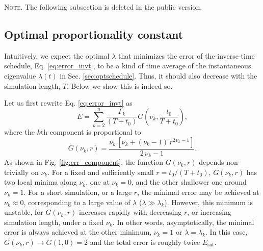 \documentclass[reprint, floatfix]{revtex4-1}
\newcommand{\note}[1]{{\color{DarkGreen}\footnotesize \textsc{Note.} #1}}
\newcommand{\Err}{E}
\begin{document}
%






\note{The following subsection is deleted in the public version.

\subsection{\label{sec:optlambda}
Optimal proportionality constant
}




Intuitively,
we expect the optimal $\lambda$
that minimizes the error of the inverse-time schedule,
Eq. \eqref{eq:error_invt},
to be a kind of time average of
the instantaneous eigenvalue $\lambda(t)$
in Sec. \ref{sec:optschedule}.
%
Thus, it should also decrease with
the simulation length, $T$.
%
Below we show this is indeed so.

Let us first rewrite Eq. \eqref{eq:error_invt} as
%
$$
\Err
=
\sum_{ k = 2 }^n
  \frac{ \Gamma_k  }
       { (T + t_0) }
  G\left( \nu_k, \frac{ t_0 } { T + t_0} \right),
$$
%
where the $k$th component is proportional to
%
$$
G\left( \nu_k, r \right)
=
\frac { \nu_k
        \,
        \left[
          \nu_k
          +
          (\nu_k - 1) \,
          r^{2 \, \nu_k - 1}
        \right]
      }
      { 2 \, \nu_k - 1 }
.
$$
%
As shown in Fig. \ref{fig:err_component},
the function $G(\nu_k, r)$ depends non-trivially on $\nu_k$.
%
For a fixed and sufficiently small $r = t_0 / (T + t_0)$,
$G(\nu_k, r)$ has two local minima along $\nu_k$,
one at $\nu_k = 0$,
and the other shallower one around $\nu_k = 1$.
%
For a short simulation, or a large $r$,
the minimal error may be achieved at $\nu_k \approx 0$,
corresponding to a large value of $\lambda$
($\lambda \gg \lambda_k$).
%
However, this minimum is unstable,
for $G(\nu_k, r)$ increases rapidly
with decreasing $r$, or increasing simulation length,
under a fixed $\nu_k$.
%
In other words,
asymptotically, the minimal error
is always achieved at the other minimum,
$\nu_k = 1$ or $\lambda = \lambda_k$.
%
In this case,
$G(\nu_k, r) \to G(1, 0) = 2$
and the total error is roughly twice $E_\mathrm{sat}$.



}
\end{document}
